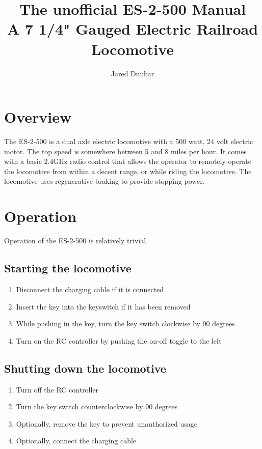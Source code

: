 \documentclass{book}
\title{
    \huge{The unofficial ES-2-500 Manual}
    \\
    \vspace{2 mm}
    \small{A 7 1/4" Gauged Electric Railroad Locomotive}
}
\author{Jared Dunbar}
\begin{document}
\maketitle

\tableofcontents

\newpage

\chapter{Overview}

The ES-2-500 is a dual axle electric locomotive with a 500 watt, 24 volt electric motor. The top speed is somewhere between 5 and 8 miles per hour. It comes with a basic 2.4GHz radio control that allows the operator to remotely operate the locomotive from within a decent range, or while riding the locomotive. The locomotive uses regenerative braking to provide stopping power.

\chapter{Operation}

Operation of the ES-2-500 is relatively trivial.

\section{Starting the locomotive}

\begin {enumerate}
    \item {Disconnect the charging cable if it is connected}
    \item {Insert the key into the keyswitch if it has been removed}
    \item {While pushing in the key, turn the key switch clockwise by 90 degrees}
    \item {Turn on the RC controller by pushing the on-off toggle to the left}
\end {enumerate}

\section{Shutting down the locomotive}

\begin{enumerate}
    \item {Turn off the RC controller}
    \item {Turn the key switch counterclockwise by 90 degrees}
    \item {Optionally, remove the key to prevent unauthorized usage}
    \item {Optionally, connect the charging cable}
\end {enumerate}
\end{document}
